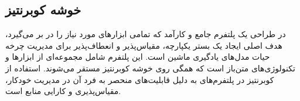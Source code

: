 \subsection{خوشه کوبرنتیز}
در طراحی یک پلتفرم  جامع و کارآمد که تمامی ابزارهای مورد نیاز را در بر می‌گیرد، هدف اصلی ایجاد یک بستر یکپارچه، مقیاس‌پذیر و انعطاف‌پذیر برای مدیریت چرخه حیات مدل‌های یادگیری ماشین است. این پلتفرم شامل مجموعه‌ای از ابزارها و تکنولوژی‌های متن‌باز است که همگی روی خوشه کوبرنتیز مستقر می‌شوند. استفاده از کوبرنتیز در پلتفرم‌های  به دلیل قابلیت‌های منحصر به فرد آن در مدیریت خودکار، مقیاس‌پذیری و کارایی منابع است. 







